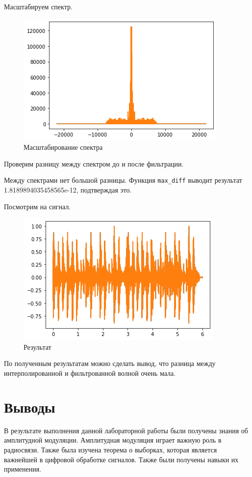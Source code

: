 \documentclass[a4paper, 14pt]{extarticle}
\begin{document}
    Масштабируем спектр.

    \begin{figure}[H]
        \centering
        \includegraphics[width=0.8\linewidth]{drum_zoomed}
        \caption{Масштабирование спектра}
        \label{fig:drum_zoomed}
    \end{figure}

    Проверим разницу между спектром до и после фильтрации.

    Между спектрами нет большой разницы.
    Функция \texttt{max\_diff} выводит результат 1.8189894035458565e-12, подтверждая это.

    Посмотрим на сигнал.

    \begin{figure}[H]
        \centering
        \includegraphics[width=0.8\linewidth]{result}
        \caption{Результат}
        \label{fig:result}
    \end{figure}

    По полученным результатам можно сделать вывод, что разница между интерполированной и фильтрованной волной очень мала.

    \newpage


    \section{Выводы}
    \label{sec:conclusions}

    В результате выполнения данной лабораторной работы были получены знания об амплитудной модуляции.
    Амплитудная модуляция играет важную роль в радиосвязи.
    Также была изучена теорема о выборках, которая является важнейшей в цифровой обработке сигналов.
    Также были получены навыки их применения.
\end{document}
